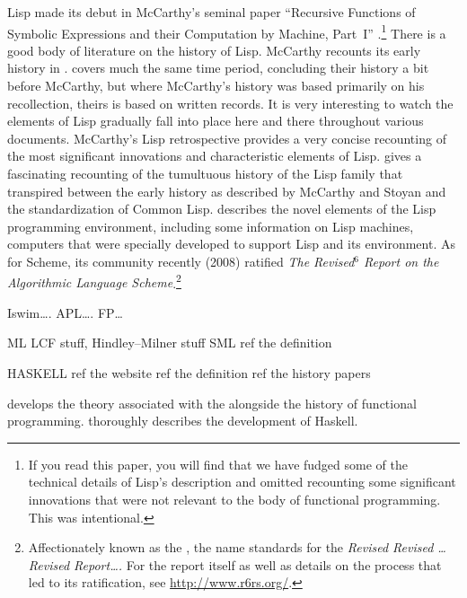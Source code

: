 Lisp made its debut in McCarthy's seminal paper ``Recursive Functions of Symbolic Expressions and their Computation by Machine, Part~I'' \citep{McCarthy:Recursive:1960}.\footnote{If you read this paper, you will find that we have fudged some of the technical details of Lisp's description and omitted recounting some significant innovations that were not relevant to the body of functional programming. This was intentional.} There is a good body of literature on the history of Lisp. McCarthy recounts its early history in \citet{McCarthy:History:1978}. \citet{Stoyan:Early:1984} covers much the same time period, concluding their history a bit before McCarthy, but where McCarthy's history was based primarily on his recollection, theirs is based on written records. It is very interesting to watch the elements of Lisp gradually fall into place here and there throughout various documents. McCarthy's Lisp retrospective \citep{McCarthy:LISP:1980} provides a very concise recounting of the most significant innovations and characteristic elements of Lisp.  gives a fascinating recounting of the tumultuous history of the Lisp family that transpired between the early history as described by McCarthy and Stoyan and the standardization of Common Lisp.  describes the novel elements of the Lisp programming environment, including some information on Lisp machines, computers that were specially developed to support Lisp and its environment. As for Scheme, its community recently (2008) ratified \textit{The Revised$^{6}$ Report on the Algorithmic Language Scheme}.\footnote{Affectionately known as the , the name standards for the \textit{Revised Revised \dots Revised Report\dots.} For the report itself as well as details on the process that led to its ratification, see \url{http://www.r6rs.org/}.}

Iswim\dots\citet{Landin:The-next:1966}.
APL\dots\citet{Iverson:A-programming:1962}.
FP\dots\citet{Backus:Can-programming:1978}

ML LCF stuff, Hindley--Milner stuff
SML ref the definition

HASKELL
ref the website
ref the definition
ref the history papers

\citet{Hudak:Conception:1989} develops the theory associated with the \lambdacalc alongside the history of functional programming. \citet{Hudak:A-history:2007} thoroughly describes the development of Haskell.

